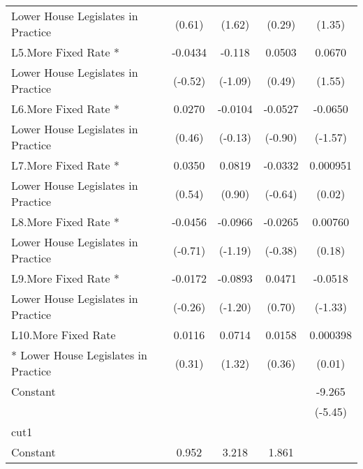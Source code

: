 {\begin{tabular}{l*{4}{c}}
Lower House Legislates in Practice&      (0.61)         &      (1.62)         &      (0.29)         &      (1.35)         \\
[1em]
L5.More Fixed Rate *&     -0.0434         &      -0.118         &      0.0503         &      0.0670         \\
Lower House Legislates in Practice&     (-0.52)         &     (-1.09)         &      (0.49)         &      (1.55)         \\
[1em]
L6.More Fixed Rate *&      0.0270         &     -0.0104         &     -0.0527         &     -0.0650         \\
Lower House Legislates in Practice&      (0.46)         &     (-0.13)         &     (-0.90)         &     (-1.57)         \\
[1em]
L7.More Fixed Rate *&      0.0350         &      0.0819         &     -0.0332         &    0.000951         \\
Lower House Legislates in Practice&      (0.54)         &      (0.90)         &     (-0.64)         &      (0.02)         \\
[1em]
L8.More Fixed Rate *&     -0.0456         &     -0.0966         &     -0.0265         &     0.00760         \\
Lower House Legislates in Practice&     (-0.71)         &     (-1.19)         &     (-0.38)         &      (0.18)         \\
[1em]
L9.More Fixed Rate *&     -0.0172         &     -0.0893         &      0.0471         &     -0.0518         \\
Lower House Legislates in Practice&     (-0.26)         &     (-1.20)         &      (0.70)         &     (-1.33)         \\
[1em]
L10.More Fixed Rate &      0.0116         &      0.0714         &      0.0158         &    0.000398         \\
* Lower House Legislates in Practice&      (0.31)         &      (1.32)         &      (0.36)         &      (0.01)         \\
[1em]
Constant            &                     &                     &                     &      -9.265\sym{***}\\
                    &                     &                     &                     &     (-5.45)         \\
\hline
cut1                &                     &                     &                     &                     \\
Constant            &       0.952         &       3.218\sym{***}&       1.861\sym{***}&                     \\

\end{tabular}}
